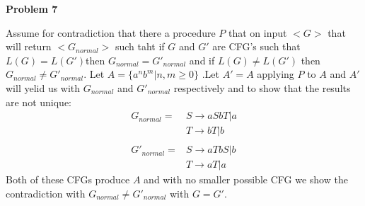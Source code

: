 \documentclass[letterpaper,12pt]{article}
\makeatletter
\newcommand\exercise[1]{\par\vspace{4ex}\normalfont\normalsize\noindent
\textbf{\large Problem #1}\par\nobreak\@afterindentfalse\@afterheading}
\makeatother
\begin{document}
\exercise{7}
Assume for contradiction that there a procedure $P$ that on input $<G>$ that will return $<G_{normal}>$ such taht if $G$ and $G'$ are CFG's such that $L(G) = L(G')$then $G_{normal} = G'_{normal}$ and if $L(G)\neq L(G')$ then $G_{normal} \neq G'_{normal}$. Let $A = \{a^nb^m | n,m \geq 0\}$ .Let $A' = A$ applying $P$ to $A$ and $A'$ will yelid us with $G_{normal}$ and $G'_{normal}$ respectively  and to show that the results are not unique:\\
\begin{align*}
G_{normal} = &S \rightarrow aSbT | a\\
&T \rightarrow bT | b\\
\\G'_{normal} = &S \rightarrow aTbS | b\\
&T \rightarrow aT | a
\end{align*}
Both of these CFGs produce $A$ and with no smaller possible CFG we show the contradiction with $G_{normal} \neq G'_{normal}$ with $G = G'$.
\end{document}
